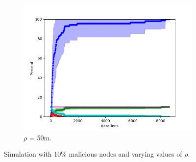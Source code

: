 \begin{figure}
\begin{subfigure}{0.5\textwidth}
\includegraphics[width=\linewidth]{images/plots/Network_rA_10.0/new_plots/50.png}
\caption{$\rho$ = 50m.} \label{fig:tarjan0}
\end{subfigure}

\caption{Simulation with 10\% malicious nodes and varying values of $\rho$.}
\label{fig:random103050}
\end{figure}



